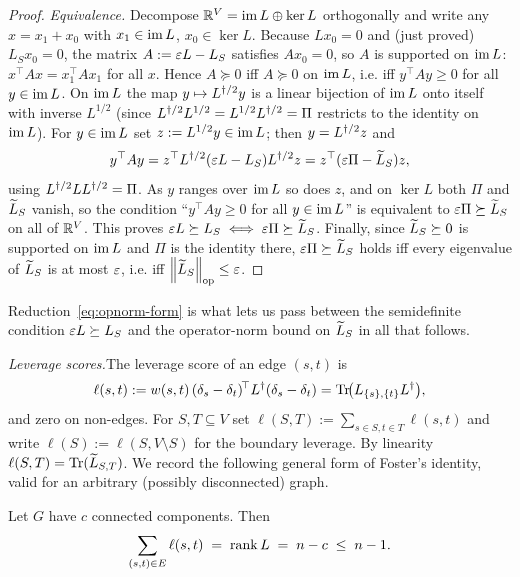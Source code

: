 \begin{proof}
\emph{Equivalence.} Decompose $\mathbb{R}^V=\operatorname{im} L\oplus\ker L$ orthogonally and
write any $x=x_1+x_0$ with $x_1\in\operatorname{im} L$, $x_0\in\ker L$. Because
$L x_0=0$ and (just proved) $L_S x_0=0$, the matrix $A:=\varepsilon L-L_S$ satisfies
$A x_0=0$, so $A$ is supported on $\operatorname{im} L$:
$x^\top A x=x_1^\top A x_1$ for all $x$. Hence $A\succeq 0$ iff $A\succeq 0$ on
$\operatorname{im} L$, i.e. iff $y^\top A y\ge 0$ for all $y\in\operatorname{im} L$.
On $\operatorname{im} L$ the map $y\mapsto L^{\dagger/2} y$ is a linear bijection of $\operatorname{im} L$
onto itself with inverse $L^{1/2}$ (since $L^{\dagger/2} L^{1/2}=L^{1/2}L^{\dagger/2}=\Pi$
restricts to the identity on $\operatorname{im} L$). For $y\in\operatorname{im} L$ set $z:=L^{1/2}y\in\operatorname{im} L$;
then $y=L^{\dagger/2} z$ and
\[
  y^\top A y
  =z^\top L^{\dagger/2}(\varepsilon L-L_S)L^{\dagger/2} z
  =z^\top(\varepsilon\Pi-\widetilde{L}_S)z ,
\]
using $L^{\dagger/2} LL^{\dagger/2}=\Pi$. As $y$ ranges over $\operatorname{im} L$ so does $z$, and on
$\ker L$ both $\Pi$ and $\widetilde{L}_S$ vanish, so the condition ``$y^\top Ay\ge0$ for
all $y\in\operatorname{im} L$'' is equivalent to $\varepsilon\Pi\succeq\widetilde{L}_S$ on all of
$\mathbb{R}^V$. This proves $\varepsilon L\succeq L_S\iff\varepsilon\Pi\succeq\widetilde{L}_S$.
Finally, since $\widetilde{L}_S\succeq0$ is supported on $\operatorname{im} L$ and $\Pi$ is the
identity there, $\varepsilon\Pi\succeq\widetilde{L}_S$ holds iff every eigenvalue of
$\widetilde{L}_S$ is at most $\varepsilon$, i.e. iff
$\left\lVert \widetilde{L}_S \right\rVert_{\mathrm{op}}\le\varepsilon$.
\end{proof}

Reduction~\eqref{eq:opnorm-form} is what lets us pass between the semidefinite
condition $\varepsilon L\succeq L_S$ and the operator-norm bound on $\widetilde{L}_S$ in all
that follows.

\medskip
\noindent\emph{Leverage scores.}\quad The leverage score of an edge $(s,t)$ is
\[
  \ell(s,t)
   := w(s,t)\,(\delta_s-\delta_t)^{\!\top}L^{\dagger}(\delta_s-\delta_t)
    = \operatorname{Tr}\!\bigl(L_{\{s\},\{t\}}L^{\dagger}\bigr),
\]
and zero on non-edges. For $S,T\subseteq V$ set
$\ell(S,T):=\sum_{s\in S,t\in T}\ell(s,t)$ and write
$\ell(S):=\ell(S,V\setminus S)$ for the boundary leverage. By linearity
$\ell(S,T)=\operatorname{Tr}(\widetilde{L}_{S,T})$. We record the following general form of
Foster's identity, valid for an arbitrary (possibly disconnected) graph.

\begin{qsixproposition}\label{prop:foster}
Let $G$ have $c$ connected components. Then
\[
  \sum_{(s,t)\in E}\ell(s,t)\;=\;\operatorname{rank} L\;=\;n-c\;\le\;n-1 .
\]
\end{qsixproposition}

